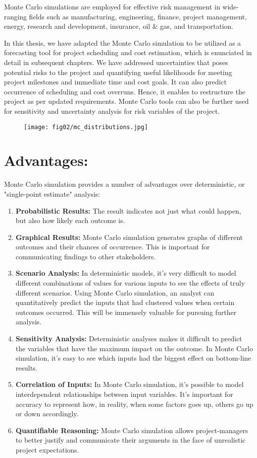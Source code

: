 Monte Carlo simulations are employed for effective risk management in wide-ranging fields such as manufacturing, engineering, finance, project management, energy, research and development, insurance, oil \& gas, and transportation. 

In this thesis, we have adapted the Monte Carlo simulation to be utilized as a forecasting tool for project scheduling and cost estimation, which is enunciated in detail in subsequent chapters. We have addressed uncertainties that poses potential risks to the project and quantifying useful likelihoods for meeting project milestones and immediate time and cost goals. It can also predict occurrence of scheduling and cost overruns. Hence, it enables to restructure the project as per updated requirements. Monte Carlo tools can also be further used for sensitivity and uncertainty analysis for risk variables of the project. 

\begin{figure}
	\centering
	\texttt{[image: fig02/mc\_distributions.jpg]}
\end{figure}
\section{Advantages:}
Monte Carlo simulation provides a number of advantages over deterministic, or "single-point estimate" analysis:
\begin{enumerate}
	\item \textbf{Probabilistic Results:} The result indicates not just what could happen, but also how likely each outcome is.
	 \item \textbf{Graphical Results:} Monte Carlo simulation generates graphs of different outcomes and their chances of occurrence. This is important for communicating findings to other stakeholders.
	 \item \textbf{Scenario Analysis:} In deterministic models, it’s very difficult to model different combinations of values for various inputs to see the effects of truly different scenarios. Using Monte Carlo simulation, an analyst can quantitatively predict the inputs that had clustered values when certain outcomes occurred. This will be immensely valuable for pursuing further analysis.
     \item \textbf{Sensitivity Analysis:} Deterministic analyses makes it difficult to predict the variables that have the maximum impact on the outcome. In Monte Carlo simulation, it’s easy to see which inputs had the biggest effect on bottom-line results.
	 \item \textbf{Correlation of Inputs:} In Monte Carlo simulation, it's possible to model interdependent relationships between input variables. It’s important for accuracy to represent how, in reality, when some factors goes up, others go up or down accordingly.
	 \item \textbf{Quantifiable Reasoning:} Monte Carlo simulation allows project-managers to better justify and communicate their arguments in the face of unrealistic project expectations.
\end{enumerate}

 

















